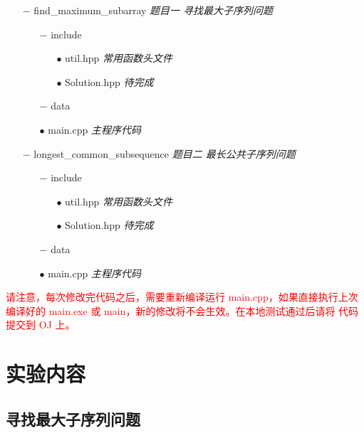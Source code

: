 \documentclass[12pt,a4paper]{article}
\begin{document}
\begin{itemize}[noitemsep]
    \item[$-$] find\_maximum\_subarray \textit{题目一 \hspace{0.2cm}寻找最大子序列问题}
        \begin{itemize}[noitemsep]
            \item[$-$] include
                \begin{itemize}[noitemsep]
                    \item[$\bullet$] util.hpp \textit{常用函数头文件}
                    \item[$\bullet$] Solution.hpp \textit{待完成}
                \end{itemize}
            \item[$-$] data
            \item[$\bullet$] main.cpp \textit{主程序代码}
        \end{itemize}
    \item[$-$] longest\_common\_subsequence \textit{题目二 \hspace{0.2cm}最长公共子序列问题}
        \begin{itemize}[noitemsep]
            \item[$-$] include
                \begin{itemize}[noitemsep]
                    \item[$\bullet$] util.hpp \textit{常用函数头文件}
                    \item[$\bullet$] Solution.hpp \textit{待完成}
                \end{itemize}
            \item[$-$] data
            \item[$\bullet$] main.cpp \textit{主程序代码}
        \end{itemize}
\end{itemize}

\textcolor{red}{请注意，每次修改完代码之后，需要重新编译运行 main.cpp，如果直接执行上次编译好的 main.exe 或 main，新的修改将不会生效。在本地测试通过后请将
    代码提交到 OJ 上。}

\section{实验内容}

\subsection{寻找最大子序列问题}
\end{document}
